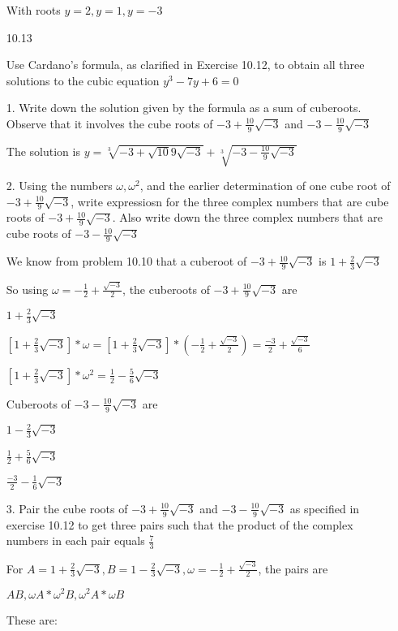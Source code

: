\documentclass[12pt]{article}
\begin{document}
\begin{itemize}
	With roots $y = 2, y = 1, y = -3$

\newpage

\item[10.13]

Use Cardano's formula, as clarified in Exercise 10.12, to obtain all three solutions to the cubic equation $y^3 - 7y + 6 = 0$

1. Write down the solution given by the formula as a sum of cuberoots. Observe that it involves the cube roots of $-3 + \frac{10}{9}\sqrt{-3}$ and $-3 - \frac{10}{9}\sqrt{-3}$

The solution is $y = \sqrt[3]{-3 + \sqrt{10}{9}\sqrt{-3}} + \sqrt[3]{-3 - \frac{10}{9}\sqrt{-3}}$

2. Using the numbers $\omega, \omega ^2$, and the earlier determination of one cube root of $-3 + \frac{10}{9}\sqrt{-3}$, write expressiosn for the three complex numbers that are cube roots of $-3 + \frac{10}{9}\sqrt{-3}$. Also write down the three complex numbers that are cube roots of $-3 - \frac{10}{9}\sqrt{-3}$

We know from problem 10.10 that a cuberoot of $-3 + \frac{10}{9}\sqrt{-3}$ is $1 + \frac{2}{3}\sqrt{-3}$

So using $\omega = -\frac{1}{2} + \frac{\sqrt{-3}}{2}$, the cuberoots of $-3 + \frac{10}{9}\sqrt{-3}$ are 

$1 + \frac{2}{3}\sqrt{-3}$

$[1 + \frac{2}{3}\sqrt{-3}]*\omega = [1 + \frac{2}{3}\sqrt{-3}]*(-\frac{1}{2} + \frac{\sqrt{-3}}{2}) = \frac{-3}{2} + \frac{\sqrt{-3}}{6}$

$[1 + \frac{2}{3}\sqrt{-3}]*\omega ^2 = \frac{1}{2} - \frac{5}{6}\sqrt{-3}$

Cuberoots of $-3 - \frac{10}{9}\sqrt{-3}$ are

$1 - \frac{2}{3}\sqrt{-3}$

$\frac{1}{2} + \frac{5}{6}\sqrt{-3}$

$\frac{-3}{2} - \frac{1}{6}\sqrt{-3}$

3. Pair the cube roots of $-3 + \frac{10}{9}\sqrt{-3}$ and $-3-\frac{10}{9}\sqrt{-3}$ as specified in exercise 10.12 to get three pairs such that the product of the complex numbers in each pair equals $\frac{7}{3}$

For $A = 1 + \frac{2}{3}\sqrt{-3}, B = 1 - \frac{2}{3}\sqrt{-3}, \omega = -\frac{1}{2} + \frac{\sqrt{-3}}{2}$, the pairs are

$AB, \omega A * \omega ^2 B, \omega ^2 A * \omega B$

These are:


\end{itemize}
\end{document}
